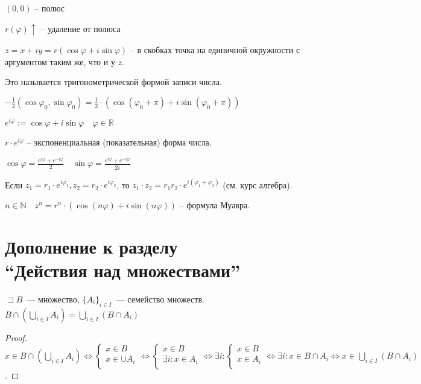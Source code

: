 \documentclass{book}
\newcommand\N{\ensuremath{\mathbb{N}}}
\newcommand\R{\ensuremath{\mathbb{R}}}
\renewcommand\phi{\varphi}
\theoremstyle{definition}
\begin{document}
    $(0,0)$ -- полюс

    $r(\phi) \uparrow$ -- удаление от полюса

    $z = x+iy = r(\cos \phi + i\sin \phi)$ -- в скобках точка на единичной окружности с аргументом таким же, что и у $z$.

    Это называется тригонометрической формой записи числа.

    $-\frac{1}{2}(\cos \phi_0, \sin \phi_0) = \frac{1}{2} \cdot  \left( \cos (\phi_0+\pi ) + i\sin (\phi_0+\pi ) \right) $

    $e^{i\phi}:=\cos \phi + i\sin\phi\quad \phi\in \R$

    $r\cdot e^{i\phi}$ -- экспоненциальная (показательная) форма числа.

    $\cos \phi = \frac{e^{i\phi} + e^{-i\phi}}{2}\quad \sin \phi = \frac{e^{i\phi} + e^{-i\phi}}{2i}$

    Если $z_1 = r_1 \cdot  e^{i\phi_1}, z_2 = r_2 \cdot  e^{i\phi_2}$, то $z_1\cdot z_2 = r_1r_2\cdot e^{i\left( \phi_1 + \phi_2 \right) }$ (см. курс алгебра).

    $n\in \N \quad z^n = r^n \cdot  (\cos (n\phi) + i\sin(n\phi))$ -- формула Муавра.

    \section{Дополнение к разделу\\``Действия над множествами''}

    \begin{statement}
        $\sqsupset B$~--- множество, $\{A_i\}_{i\in I}$~--- семейство множеств. \\
        $B\cap \left( \bigcup\limits_{i \in  I} A_i \right)  = \bigcup\limits_{i \in  I} \left( B\cap A_i \right) $
    \end{statement}
    \begin{proof}
        $x\in B\cap \left( \bigcup\limits_{i \in  I} A_i \right) \iff \begin{cases}
            x\in B\\
            x\in \cup A_i\\
        \end{cases} \iff  
        \begin{cases}
            x\in B\\
            \exists i:x\in A_i\\
        \end{cases} \iff  \exists i: 
        \begin{cases}
            x\in B\\
            x\in A_i\\
        \end{cases} \iff \exists i: x\in B\cap A_i \iff x\in  \bigcup\limits_{i \in  I} \left( B\cap A_i \right)$.
        \end{proof}
\end{document}
